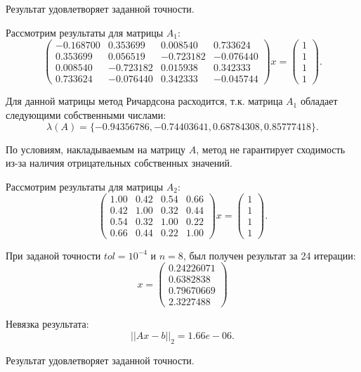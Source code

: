 \documentclass[a4paper,12pt]{article}
\begin{document}
		Результат удовлетворяет заданной точности.
		
		Рассмотрим результаты для матрицы $A_1$:
		\[
		\begin{pmatrix}
			-0.168700 & 0.353699 & 0.008540 & 0.733624 \\
			0.353699 & 0.056519 & -0.723182 & -0.076440 \\
			0.008540 & -0.723182 & 0.015938 & 0.342333 \\
			0.733624 & -0.076440 & 0.342333 & -0.045744
		\end{pmatrix}
		x = 
		\begin{pmatrix}
			1\\
			1\\
			1\\
			1
		\end{pmatrix}.
		\]
	
		Для данной матрицы метод Ричардсона расходится, т.к. матрица $A_1$ обладает следующими собственными числами:
		\[ \lambda (A) = \{ -0.94356786, -0.74403641,  0.68784308,  0.85777418 \}.\]
	
		По условиям, накладываемым на матрицу $A$, метод не гарантирует сходимость из-за наличия отрицательных собственных значений. 
		
	
		Рассмотрим результаты для матрицы $A_2$:
		\[
			\begin{pmatrix}
				1.00 & 0.42 & 0.54 & 0.66 \\
				0.42 & 1.00 & 0.32 & 0.44 \\
				0.54 & 0.32 & 1.00 & 0.22 \\
				0.66 & 0.44 & 0.22 & 1.00
			\end{pmatrix} x = 
			\begin{pmatrix}
				1\\1\\1\\1
			\end{pmatrix}.
		\]	
	
		При заданой точности $tol=10^{-4}$ и $n=8$, был получен результат за 24 итерации:
		\[
			x = 
			\begin{pmatrix}
				0.24226071 \\ 0.6382838\\  0.79670669\\ 2.3227488
			\end{pmatrix}
		\]
	
		Невязка результата:
		\[
			||Ax - b||_2 = 1.66e-06.
		\]
		
	Результат удовлетворяет заданной точности.
	
\end{document}
